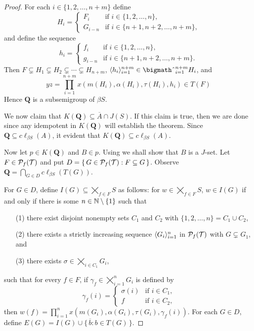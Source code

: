 \begin{proof}
  For each $i \in \{1, 2, \ldots, n+m\}$ define 
  \[
    H_i = 
    \begin{cases}
      F_i & \mbox{if $i \in \{1, 2, \ldots, n\}$,} \\
      G_{i-n} & \mbox{if $i \in \{n+1, n+2, \ldots, n+m\}$,}
    \end{cases}
  \]
  and define the sequence
  \[
    h_i =
    \begin{cases}
      f_i & \mbox{if $i \in \{1, 2, \ldots, n\}$,} \\
      g_{i-n} & \mbox{if $i \in \{n+1, n+2, \ldots, n+m\}$.}
    \end{cases}
  \]
  Then $F \subsetneq H_1 \subsetneq H_2 \subsetneq \cdots \subsetneq H_{n+m}$, $\la h_i \ra_{i=1}^{n+m} \in \bigtimes_{i=1}^{n+m} H_i$, and 
  \[
    \textstyle
    yz = \prod_{i=1}^{n+m} x(m(H_i), \alpha(H_i), \tau(H_i), h_i) \in T(F)
  \]
  Hence $\mathbf{Q}$ is a subsemigroup of $\beta S$. 

  We now claim that $K(\mathbf{Q}) \subseteq \overline{A} \cap J(S)$. 
  If this claim is true, then we are done since any idempotent in $K(\mathbf{Q})$ will establish the theorem. 
  Since $\mathbf{Q} \subseteq c\ell_{\beta S} (A)$, it evident that $K(\mathbf{Q}) \subseteq c\ell_{\beta S} (A)$. 

  Now let $p \in K(\mathbf{Q})$ and $B \in p$.
  Using \cite[Lemma 14.9]{Hindman:1998fk} we shall show that $B$ is a $J$-set. 
  Let $F \in \mathcal{P}_f(\mathcal{T})$ and put $D = \{\, G \in \mathcal{P}_f(\mathcal{T}) : F \subseteq G \,\}$. 
  Observe $\mathbf{Q} = \bigcap_{G \in D} c\ell_{\beta S} (T(G))$.

  For $G \in D$, define $I(G) \subseteq \bigtimes_{f \in F} S$ as follows: for $w \in \bigtimes_{f \in F} S$, $w \in I(G)$ if and only if there is some $n \in \mathbb{N} \setminus \{1\}$ such that 
  \begin{itemize}
    \item[(1)]
      there exist disjoint nonempty sets $C_1$ and $C_2$ with $\{1, 2, \ldots, n\} = C_1 \cup C_2$, 
      
    \item[(2)]
      there exists a strictly increasing sequence $\langle G_i \rangle_{i=1}^n$ in $\mathcal{P}_f(\mathcal{T})$ with $G \subsetneq G_1$, and

    \item[(3)]
      there exists $\sigma \in \bigtimes_{i \in C_1} G_i$, 
  \end{itemize}
such that for every $f \in F$, if $\gamma_f \in \bigtimes_{i=1}^n G_i$ is defined by 
  \[
    \gamma_f(i) = 
    \begin{cases}
      \sigma(i) & \mbox{if $i \in C_1$,} \\
      f & \mbox{if $i \in C_2$,} 
    \end{cases}
  \]
then $w(f) = \prod_{i=1}^n x(m(G_i), \alpha(G_i), \tau(G_i), \gamma_f(i))$.
  For each $G \in D$, define $E(G) = I(G) \cup \{\, \overline{b} : b \in T(G) \,\}$. 


\end{proof}
